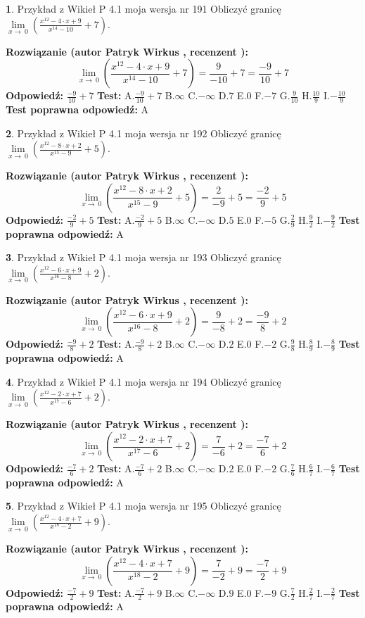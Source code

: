 \documentclass[12pt, a4paper]{article}
\theoremstyle{definition} %
\newtheorem{zad}{}
\newcommand{\zadStart}[1]{\begin{zad}#1\newline}
\newcommand{\zadStop}{\end{zad}}
\newcommand{\rozwStart}[2]{\noindent \textbf{Rozwiązanie (autor #1 , recenzent #2): }\newline}
\newcommand{\rozwStop}{\newline}
\newcommand{\odpStart}{\noindent \textbf{Odpowiedź:}\newline}
\newcommand{\odpStop}{\newline}
\newcommand{\testStart}{\noindent \textbf{Test:}\newline}
\newcommand{\testStop}{\newline}
\newcommand{\kluczStart}{\noindent \textbf{Test poprawna odpowiedź:}\newline}
\newcommand{\kluczStop}{\newline}
\begin{document}
\zadStart{Przykład z Wikieł P 4.1 moja wersja nr 191}
Obliczyć granicę $\lim\limits_{x\to\ 0}(\frac{x^{12}-4 \cdot x +9}{x^{14}-10}+7)$.
\zadStop
\rozwStart{Patryk Wirkus}{}
$$\lim\limits_{x\to\ 0}(\frac{x^{12}-4 \cdot x +9}{x^{14}-10}+7)=\frac{9}{-10}+7=\frac{-9}{10}+7$$
\rozwStop
\odpStart
$\frac{-9}{10}+7$
\odpStop
\testStart
A.$\frac{-9}{10}+7$
B.$\infty$
C.$-\infty$
D.$7$
E.$0$
F.$-7$
G.$\frac{9}{10}$
H.$\frac{10}{9}$
I.$-\frac{10}{9}$
\testStop
\kluczStart
A
\kluczStop



\zadStart{Przykład z Wikieł P 4.1 moja wersja nr 192}
Obliczyć granicę $\lim\limits_{x\to\ 0}(\frac{x^{12}-8 \cdot x +2}{x^{15}-9}+5)$.
\zadStop
\rozwStart{Patryk Wirkus}{}
$$\lim\limits_{x\to\ 0}(\frac{x^{12}-8 \cdot x +2}{x^{15}-9}+5)=\frac{2}{-9}+5=\frac{-2}{9}+5$$
\rozwStop
\odpStart
$\frac{-2}{9}+5$
\odpStop
\testStart
A.$\frac{-2}{9}+5$
B.$\infty$
C.$-\infty$
D.$5$
E.$0$
F.$-5$
G.$\frac{2}{9}$
H.$\frac{9}{2}$
I.$-\frac{9}{2}$
\testStop
\kluczStart
A
\kluczStop



\zadStart{Przykład z Wikieł P 4.1 moja wersja nr 193}
Obliczyć granicę $\lim\limits_{x\to\ 0}(\frac{x^{12}-6 \cdot x +9}{x^{16}-8}+2)$.
\zadStop
\rozwStart{Patryk Wirkus}{}
$$\lim\limits_{x\to\ 0}(\frac{x^{12}-6 \cdot x +9}{x^{16}-8}+2)=\frac{9}{-8}+2=\frac{-9}{8}+2$$
\rozwStop
\odpStart
$\frac{-9}{8}+2$
\odpStop
\testStart
A.$\frac{-9}{8}+2$
B.$\infty$
C.$-\infty$
D.$2$
E.$0$
F.$-2$
G.$\frac{9}{8}$
H.$\frac{8}{9}$
I.$-\frac{8}{9}$
\testStop
\kluczStart
A
\kluczStop



\zadStart{Przykład z Wikieł P 4.1 moja wersja nr 194}
Obliczyć granicę $\lim\limits_{x\to\ 0}(\frac{x^{12}-2 \cdot x +7}{x^{17}-6}+2)$.
\zadStop
\rozwStart{Patryk Wirkus}{}
$$\lim\limits_{x\to\ 0}(\frac{x^{12}-2 \cdot x +7}{x^{17}-6}+2)=\frac{7}{-6}+2=\frac{-7}{6}+2$$
\rozwStop
\odpStart
$\frac{-7}{6}+2$
\odpStop
\testStart
A.$\frac{-7}{6}+2$
B.$\infty$
C.$-\infty$
D.$2$
E.$0$
F.$-2$
G.$\frac{7}{6}$
H.$\frac{6}{7}$
I.$-\frac{6}{7}$
\testStop
\kluczStart
A
\kluczStop



\zadStart{Przykład z Wikieł P 4.1 moja wersja nr 195}
Obliczyć granicę $\lim\limits_{x\to\ 0}(\frac{x^{12}-4 \cdot x +7}{x^{18}-2}+9)$.
\zadStop
\rozwStart{Patryk Wirkus}{}
$$\lim\limits_{x\to\ 0}(\frac{x^{12}-4 \cdot x +7}{x^{18}-2}+9)=\frac{7}{-2}+9=\frac{-7}{2}+9$$
\rozwStop
\odpStart
$\frac{-7}{2}+9$
\odpStop
\testStart
A.$\frac{-7}{2}+9$
B.$\infty$
C.$-\infty$
D.$9$
E.$0$
F.$-9$
G.$\frac{7}{2}$
H.$\frac{2}{7}$
I.$-\frac{2}{7}$
\testStop
\kluczStart
A
\kluczStop
\end{document}
